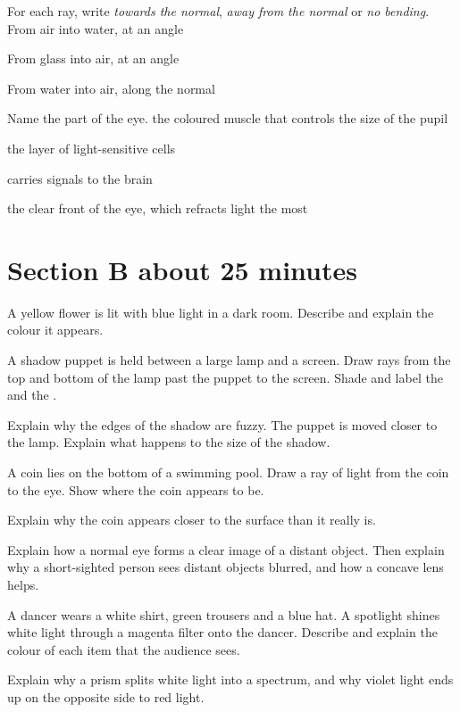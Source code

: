 \documentclass[11pt]{article}
\begin{document}
\Q For each ray, write \emph{towards the normal}, \emph{away from the normal} or \emph{no bending}. 
 From air into water, at an angle \blank[45mm]\par\smallskip
{} From glass into air, at an angle \blank[45mm]\par\smallskip
{} From water into air, along the normal \blank[45mm]

\Q Name the part of the eye. 
 the coloured muscle that controls the size of the pupil \blank[34mm]\par\smallskip
{} the layer of light-sensitive cells \blank[34mm]\par\smallskip
{} carries signals to the brain \blank[34mm]\par\smallskip
{} the clear front of the eye, which refracts light the most \blank[34mm]

\section*{Section B \hfill\normalfont\small about 25 minutes}

\Q A yellow flower is lit with blue light in a dark room. Describe and explain the colour it appears. 

\Q A shadow puppet is held between a large lamp and a screen. 
\drawbox{56mm}{\TaskPuppet[7mm]}
 Draw rays from the top and bottom of the lamp past the puppet to the screen. Shade and label the \tUmbra{} and the \tPenumbra.\par
{} Explain why the edges of the shadow are fuzzy.
 The puppet is moved closer to the lamp. Explain what happens to the size of the shadow.

\Q A coin lies on the bottom of a swimming pool. 
 Draw a ray of light from the coin to the eye. Show where the coin appears to be.\par
{} Explain why the coin appears closer to the surface than it really is.

\Q Explain how a normal eye forms a clear image of a distant object. Then explain why a short-sighted person sees distant objects blurred, and how a concave lens helps. 

\Q A dancer wears a white shirt, green trousers and a blue hat. A spotlight shines white light through a magenta filter onto the dancer. Describe and explain the colour of each item that the audience sees. 

\Q Explain why a prism splits white light into a spectrum, and why violet light ends up on the opposite side to red light. 
\end{document}
